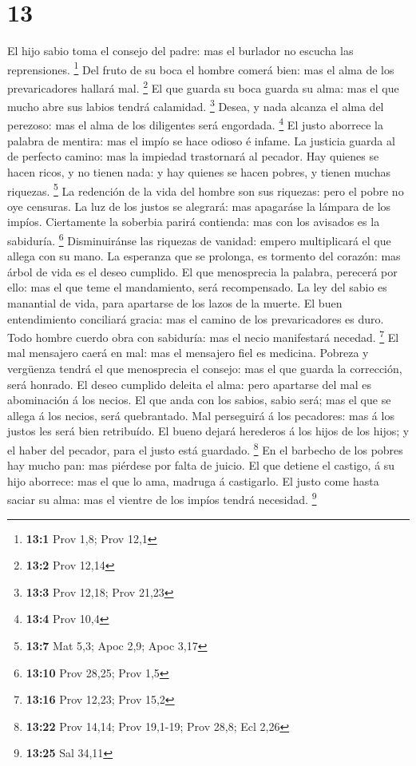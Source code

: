 \hypertarget{section-12}{%
\section{13}\label{section-12}}

 El hijo sabio toma el consejo del padre: mas el burlador no
escucha las reprensiones. \footnote{\textbf{13:1} Prov 1,8; Prov 12,1}
 Del fruto de su boca el hombre comerá bien: mas el alma de
los prevaricadores hallará mal. \footnote{\textbf{13:2} Prov 12,14}
 El que guarda su boca guarda su alma: mas el que mucho abre
sus labios tendrá calamidad. \footnote{\textbf{13:3} Prov 12,18; Prov
  21,23}  Desea, y nada alcanza el alma del perezoso: mas el
alma de los diligentes será engordada. \footnote{\textbf{13:4} Prov 10,4}
 El justo aborrece la palabra de mentira: mas el impío se
hace odioso é infame.  La justicia guarda al de perfecto
camino: mas la impiedad trastornará al pecador.  Hay quienes
se hacen ricos, y no tienen nada: y hay quienes se hacen pobres, y
tienen muchas riquezas. \footnote{\textbf{13:7} Mat 5,3; Apoc 2,9; Apoc
  3,17}  La redención de la vida del hombre son sus
riquezas: pero el pobre no oye censuras.  La luz de los
justos se alegrará: mas apagaráse la lámpara de los impíos.
 Ciertamente la soberbia parirá contienda: mas con los
avisados es la sabiduría. \footnote{\textbf{13:10} Prov 28,25; Prov 1,5}
 Disminuiránse las riquezas de vanidad: empero multiplicará
el que allega con su mano.  La esperanza que se prolonga,
es tormento del corazón: mas árbol de vida es el deseo cumplido.
 El que menosprecia la palabra, perecerá por ello: mas el
que teme el mandamiento, será recompensado.  La ley del
sabio es manantial de vida, para apartarse de los lazos de la muerte.
 El buen entendimiento conciliará gracia: mas el camino de
los prevaricadores es duro.  Todo hombre cuerdo obra con
sabiduría: mas el necio manifestará necedad. \footnote{\textbf{13:16}
  Prov 12,23; Prov 15,2}  El mal mensajero caerá en mal:
mas el mensajero fiel es medicina.  Pobreza y vergüenza
tendrá el que menosprecia el consejo: mas el que guarda la corrección,
será honrado.  El deseo cumplido deleita el alma: pero
apartarse del mal es abominación á los necios.  El que anda
con los sabios, sabio será; mas el que se allega á los necios, será
quebrantado.  Mal perseguirá á los pecadores: mas á los
justos les será bien retribuído.  El bueno dejará herederos
á los hijos de los hijos; y el haber del pecador, para el justo está
guardado. \footnote{\textbf{13:22} Prov 14,14; Prov 19,1-19; Prov 28,8;
  Ecl 2,26}  En el barbecho de los pobres hay mucho pan:
mas piérdese por falta de juicio.  El que detiene el
castigo, á su hijo aborrece: mas el que lo ama, madruga á castigarlo.
 El justo come hasta saciar su alma: mas el vientre de los
impíos tendrá necesidad. \footnote{\textbf{13:25} Sal 34,11}

